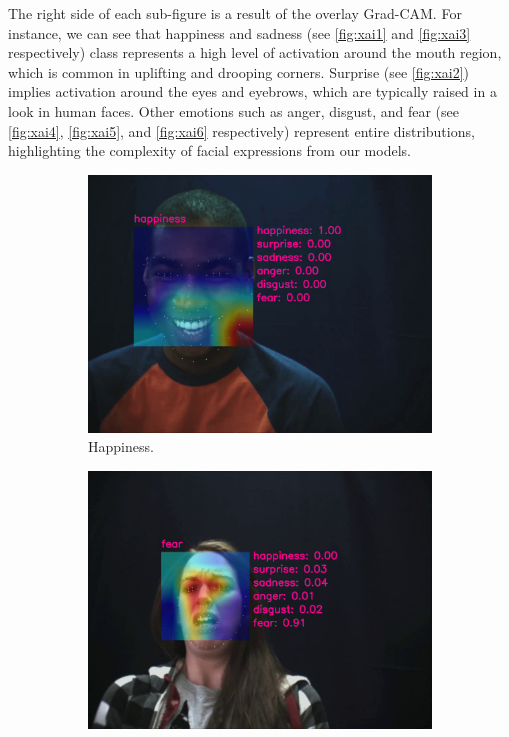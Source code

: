 The right side of each sub-figure is a result of the overlay Grad-CAM. 
For instance, 
we can see that happiness and sadness (see \cref{fig:xai1} and \cref{fig:xai3} respectively) 
class represents a high level of activation around the mouth region, 
which is common in uplifting and drooping corners. 
Surprise (see \cref{fig:xai2}) implies activation around the eyes and eyebrows, which are typically raised in a look in human faces. 
Other emotions such as anger, disgust, and fear (see \cref{fig:xai4}, \cref{fig:xai5}, and \cref{fig:xai6} respectively) 
represent entire distributions, highlighting the complexity of facial expressions from our models.

\begin{figure}[ht]
  \centering
  \begin{subfigure}{0.49\linewidth} %
    \includegraphics[width=\linewidth]{GiMeFive01.png}
    \caption{Happiness.}
    \label{fig:v1}
  \end{subfigure}
  \hfill
  \begin{subfigure}{0.49\linewidth}
    \includegraphics[width=\linewidth]{GiMeFive02.png}

\end{subfigure}
\end{figure}
